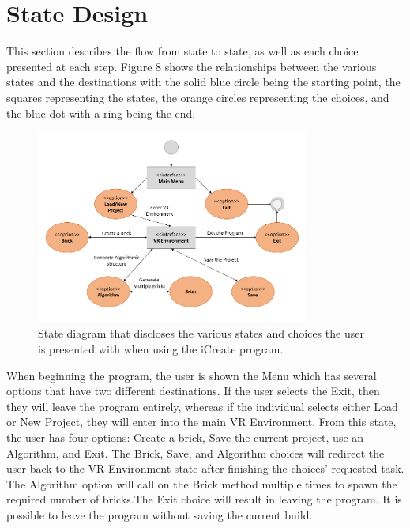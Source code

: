 \documentclass[draftclsnofoot,onecolumn,compsoc]{IEEEtran}
\begin{document}
\newpage


\section{State Design}
This section describes the flow from state to state, as well as each choice presented at each step. Figure 8 shows the relationships between the various states and the destinations with the solid blue circle being the starting point, the squares representing the states, the orange circles representing the choices, and the blue dot with a ring being the end.
\begin{figure}[H]
  \centering
    \includegraphics[width=0.8\textwidth]{state_diagram}
    \caption{State diagram that discloses the various states and choices the user is presented with when using the iCreate program. }
\end{figure}

When beginning the program, the user is shown the Menu which has several options that have two different destinations. If the user selects the Exit, then they will leave the program entirely, whereas if the individual selects either Load or New Project, they will enter into the main VR Environment. From this state, the user has four options: Create a brick, Save the current project, use an Algorithm, and Exit. The Brick, Save, and Algorithm choices will redirect the user back to the VR Environment state after finishing the choices' requested task. The Algorithm option will call on the Brick method multiple times to spawn the required number of bricks.The Exit choice will result in leaving the program. It is possible to leave the program without saving the current build.
\end{document}
